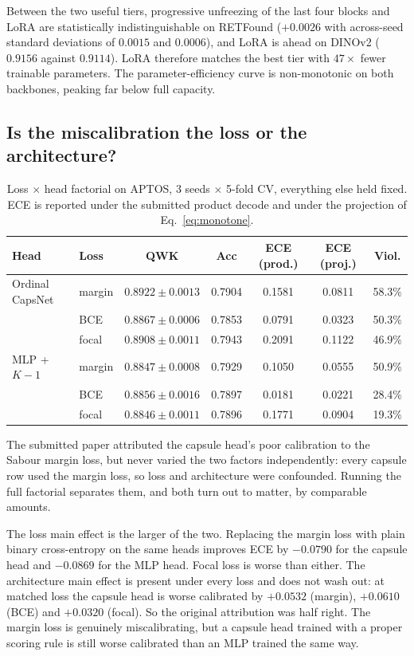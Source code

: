 \documentclass[journal]{IEEEtran}
\begin{document}
Between the two useful tiers, progressive unfreezing of the last four blocks and LoRA are statistically indistinguishable on RETFound ($+0.0026$ with across-seed standard deviations of $0.0015$ and $0.0006$), and LoRA is ahead on DINOv2 ($0.9156$ against $0.9114$). LoRA therefore matches the best tier with $47\times$ fewer trainable parameters. The parameter-efficiency curve is non-monotonic on both backbones, peaking far below full capacity.

\subsection{Is the miscalibration the loss or the architecture?}
\label{sec:loss-factorial}
\begin{table}[!t]
\centering
\caption{Loss $\times$ head factorial on APTOS, 3 seeds $\times$ 5-fold CV, everything else held fixed. ECE is reported under the submitted product decode and under the projection of Eq.~\eqref{eq:monotone}.}
\label{tab:lossfactorial}
\begin{tabular}{llccccc}
\toprule
Head & Loss & QWK & Acc & ECE (prod.) & ECE (proj.) & Viol. \\
\midrule
Ordinal CapsNet & margin & $0.8922 \pm 0.0013$ & 0.7904 & 0.1581 & 0.0811 & 58.3\% \\
 & BCE & $0.8867 \pm 0.0006$ & 0.7853 & 0.0791 & 0.0323 & 50.3\% \\
 & focal & $0.8908 \pm 0.0011$ & 0.7943 & 0.2091 & 0.1122 & 46.9\% \\
\midrule
MLP + $K{-}1$ & margin & $0.8847 \pm 0.0008$ & 0.7929 & 0.1050 & 0.0555 & 50.9\% \\
 & BCE & $0.8856 \pm 0.0016$ & 0.7897 & 0.0181 & 0.0221 & 28.4\% \\
 & focal & $0.8846 \pm 0.0011$ & 0.7896 & 0.1771 & 0.0904 & 19.3\% \\
\bottomrule
\end{tabular}
\end{table}

The submitted paper attributed the capsule head's poor calibration to the Sabour margin loss, but never varied the two factors independently: every capsule row used the margin loss, so loss and architecture were confounded. Running the full factorial separates them, and both turn out to matter, by comparable amounts.

The loss main effect is the larger of the two. Replacing the margin loss with plain binary cross-entropy on the same heads improves ECE by $-0.0790$ for the capsule head and $-0.0869$ for the MLP head. Focal loss is worse than either. The architecture main effect is present under every loss and does not wash out: at matched loss the capsule head is worse calibrated by $+0.0532$ (margin), $+0.0610$ (BCE) and $+0.0320$ (focal). So the original attribution was half right. The margin loss is genuinely miscalibrating, but a capsule head trained with a proper scoring rule is still worse calibrated than an MLP trained the same way.
\end{document}
